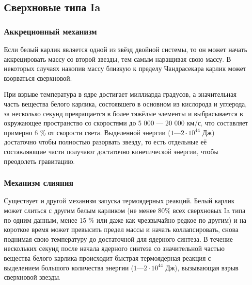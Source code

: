 \subsection{Сверхновые типа Ia}
\subsubsection{Аккреционный механизм}
Если белый карлик является одной из звёзд двойной системы, то он может начать аккрецировать массу со второй звезды, тем самым наращивая свою массу. В некоторых случаях накопив массу близкую к пределу Чандрасекара карлик может взорваться сверхновой.

При взрыве температура в ядре достигает миллиарда градусов, а значительная часть вещества белого карлика, состоявшего в основном из кислорода и углерода, за несколько секунд превращается в более тяжёлые элементы и выбрасывается в окружающее пространство со скоростями до 5 000 — 20 000 км/с, что составляет примерно 6 \% от скорости света. Выделенной энергии ($1—2\cdot10^{44}$ Дж) достаточно чтобы полностью разорвать звезду, то есть отдельные её составляющие части получают достаточно кинетической энергии, чтобы преодолеть гравитацию.

\subsubsection{Механизм слияния}
Существует и другой механизм запуска термоядерных реакций. Белый карлик может слиться с другим белым карликом (не менее 80\% всех сверхновых Ia типа по одним данным, менее 15 \% или даже как чрезвычайно редкое по другим) и на короткое время может превысить предел массы и начать коллапсировать, снова поднимая свою температуру до достаточной для ядерного синтеза. В течение нескольких секунд после начала ядерного синтеза со значительной частью вещества белого карлика происходит быстрая термоядерная реакция с выделением большого количества энергии ($1—2\cdot10^{44}$ Дж), вызывающая взрыв сверхновой звезды.
